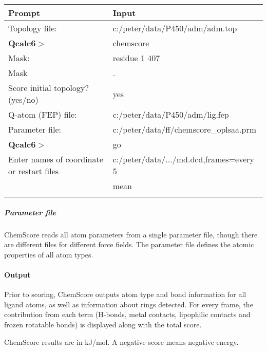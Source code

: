 \documentclass[a4paper,11pt]{article}
\begin{document}
  \begin{minipage}[t]{1.0\textwidth}
    \centering
    \begin{tabular}{ll}
      Prompt                        & Input     \\
      \hline
      Topology file:                & c:/peter/data/P450/adm/adm.top  \\
      \textbf{Qcalc6}$>$                        & chemscore    \\
      Mask:                         & residue 1 407       \\
      Mask                          & .         \\

      Score initial topology? (yes/no) & yes                                  \\
      Q-atom (FEP) file:               & c:/peter/data/P450/adm/lig.fep  \\
      Parameter file:                  & c:/peter/data/ff/chemscore\_oplsaa.prm \\
      \textbf{Qcalc6}$>$                         & go                                   \\
      Enter names of coordinate or restart files & c:/peter/data/.../md.dcd,frames=every 5                                \\
                                   &  mean                                \\
      \hline
        & \\
    \end{tabular}
    \label{xinput}
  \end{minipage}

  \subparagraph{Parameter file}
  ChemScore reads all atom parameters from a single parameter file, though there are different files for different force fields. The parameter file defines the atomic properties of all atom types.

  \paragraph{Output}
  Prior to scoring, ChemScore outputs atom type and bond information for all ligand atoms, as well as information about rings detected. For every frame, the contribution from each term (H-bonds, metal contacts, lipophilic contacts and frozen rotatable bonds) is displayed along with the total score.

  ChemScore results are in kJ/mol. A negative score means negative energy.
\end{document}
